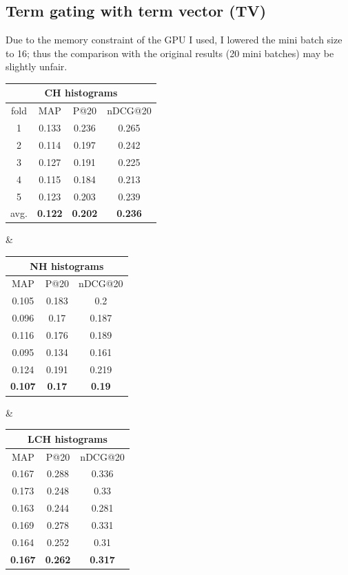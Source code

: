 \subsection{Term gating with term vector (TV)}

Due to the memory constraint of the GPU I used, I lowered the mini batch size to 16; thus the comparison with the original results (20 mini batches) may be slightly unfair.

\begin{adjustbox}{center, tabular=ccc, caption={DRMM runs, 100-100 pos/neg TV weighting, stemmed with stopwords removal}, nofloat=table}
\centering
\begin{tabular}{c|ccc}
\hline
\multicolumn{4}{c}{CH histograms} \\ \hline
fold & MAP & P@20 & nDCG@20 \\ \hline
1 & 0.133 & 0.236 & 0.265 \\
2 & 0.114 & 0.197 & 0.242 \\
3 & 0.127 & 0.191 & 0.225 \\
4 & 0.115 & 0.184 & 0.213 \\
5 & 0.123 & 0.203 & 0.239 \\ \hline
avg. & \textbf{0.122} & \textbf{0.202} & \textbf{0.236} \\
\hline
\end{tabular} &
\begin{tabular}{ccc}
\hline
\multicolumn{3}{c}{NH histograms} \\ \hline
MAP & P@20 & nDCG@20 \\ \hline
0.105 & 0.183 & 0.2 \\
0.096 & 0.17 & 0.187 \\
0.116 & 0.176 & 0.189 \\
0.095 & 0.134 & 0.161 \\
0.124 & 0.191 & 0.219 \\ \hline
\textbf{0.107} & \textbf{0.17} & \textbf{0.19} \\
\hline
\end{tabular} &
\begin{tabular}{ccc}
\hline
\multicolumn{3}{c}{LCH histograms} \\ \hline
MAP & P@20 & nDCG@20 \\ \hline
0.167 & 0.288 & 0.336 \\
0.173 & 0.248 & 0.33 \\
0.163 & 0.244 & 0.281 \\
0.169 & 0.278 & 0.331 \\
0.164 & 0.252 & 0.31 \\ \hline
\textbf{0.167} & \textbf{0.262} & \textbf{0.317} \\
\hline
\end{tabular}
\end{adjustbox}

